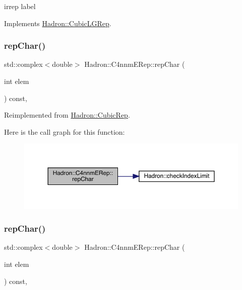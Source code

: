 irrep label 

Implements \mbox{\hyperlink{structHadron_1_1CubicLGRep_a50f5ddbb8f4be4cee0106fa9e8c75e6c}{Hadron\+::\+Cubic\+L\+G\+Rep}}.

\mbox{\label{structHadron_1_1C4nnmERep_af3cb7f743630f5a14e38a10ee61dc9ff}} 
\subsubsection{\texorpdfstring{repChar()}{repChar()}\hspace{0.1cm}{\footnotesize\ttfamily [1/3]}}
{\footnotesize\ttfamily std\+::complex$<$double$>$ Hadron\+::\+C4nnm\+E\+Rep\+::rep\+Char (\begin{DoxyParamCaption}\item[{int}]{elem }\end{DoxyParamCaption}) const\hspace{0.3cm}{\ttfamily [inline]}, {\ttfamily [virtual]}}



Reimplemented from \mbox{\hyperlink{structHadron_1_1CubicRep_af45227106e8e715e84b0af69cd3b36f8}{Hadron\+::\+Cubic\+Rep}}.

Here is the call graph for this function\+:
\nopagebreak
\begin{figure}[H]
\begin{center}
\leavevmode
\includegraphics[width=350pt]{dc/d30/structHadron_1_1C4nnmERep_af3cb7f743630f5a14e38a10ee61dc9ff_cgraph}
\end{center}
\end{figure}
\mbox{\label{structHadron_1_1C4nnmERep_af3cb7f743630f5a14e38a10ee61dc9ff}} 
\subsubsection{\texorpdfstring{repChar()}{repChar()}\hspace{0.1cm}{\footnotesize\ttfamily [2/3]}}
{\footnotesize\ttfamily std\+::complex$<$double$>$ Hadron\+::\+C4nnm\+E\+Rep\+::rep\+Char (\begin{DoxyParamCaption}\item[{int}]{elem }\end{DoxyParamCaption}) const\hspace{0.3cm}{\ttfamily [inline]}, {\ttfamily [virtual]}}



